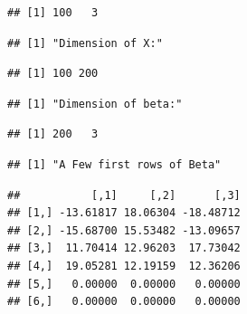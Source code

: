 \documentclass[
]{article}
\begin{document}
\begin{verbatim}
## [1] 100   3
\end{verbatim}

\begin{verbatim}
## [1] "Dimension of X:"
\end{verbatim}

\begin{verbatim}
## [1] 100 200
\end{verbatim}

\begin{verbatim}
## [1] "Dimension of beta:"
\end{verbatim}

\begin{verbatim}
## [1] 200   3
\end{verbatim}

\begin{verbatim}
## [1] "A Few first rows of Beta"
\end{verbatim}

\begin{verbatim}
##           [,1]     [,2]      [,3]
## [1,] -13.61817 18.06304 -18.48712
## [2,] -15.68700 15.53482 -13.09657
## [3,]  11.70414 12.96203  17.73042
## [4,]  19.05281 12.19159  12.36206
## [5,]   0.00000  0.00000   0.00000
## [6,]   0.00000  0.00000   0.00000
\end{verbatim}
\end{document}
